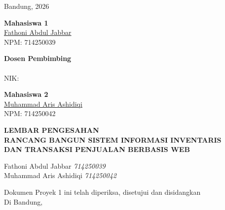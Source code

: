 \documentclass[11pt, a5paper]{article}
\begin{document}
\vspace{0.5cm}
Bandung, \hspace{3.5cm} 2026

\vspace{0.9cm}
\noindent
\begin{minipage}[t]{0.48\textwidth}
  \textbf{Mahasiswa 1}\\[2.2cm]
  \underline{Fathoni Abdul Jabbar}\\
  NPM: 714250039
\end{minipage}\hfill
\begin{minipage}[t]{0.48\textwidth}
  \textbf{Dosen Pembimbing}\\[2.2cm]
  \underline{\hspace{4.5cm}}\\
  NIK:\hspace{0.5cm}
\end{minipage}

\vspace{0.9cm}
\noindent
\begin{minipage}[t]{0.48\textwidth}
  \textbf{Mahasiswa 2}\\[2.2cm]
  \underline{Muhammad Aris Ashidiqi}\\
  NPM: 714250042
\end{minipage}

\newpage
\begin{center}
  {\large\bfseries LEMBAR PENGESAHAN}\\[6pt]
  {\normalsize\bfseries RANCANG BANGUN SISTEM INFORMASI INVENTARIS}\\
  {\normalsize\bfseries DAN TRANSAKSI PENJUALAN BERBASIS WEB}
\end{center}
\vspace{0.5cm}

\begin{flushleft}
  Fathoni Abdul Jabbar \hspace{1.5cm} \textit{714250039}\\[4pt]
  Muhammad Aris Ashidiqi \hspace{0.8cm} \textit{714250042}
\end{flushleft}

\vspace{0.4cm}
Dokumen Proyek 1 ini telah diperiksa, disetujui dan disidangkan\\
Di Bandung, \dotfill
\end{document}
